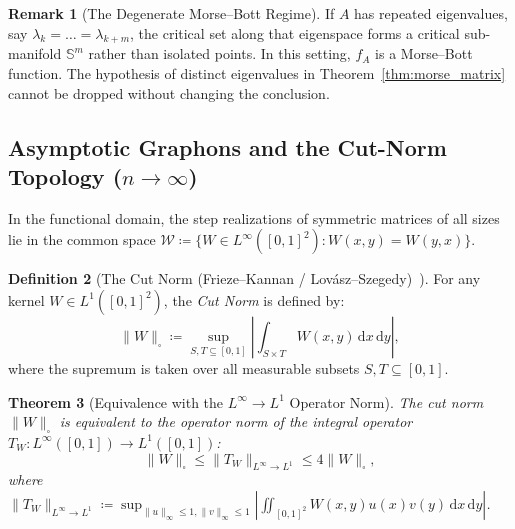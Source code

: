\documentclass[11pt,a4paper,reqno]{amsart}
\newtheorem{theorem}{Theorem}[section]
\theoremstyle{definition}
\newtheorem{definition}[theorem]{Definition}
\newtheorem{remark}[theorem]{Remark}
\numberwithin{equation}{section}
\newcommand{\Sph}{\mathbb{S}}
\newcommand{\cutnorm}[1]{\|#1\|_{\square}}
\newcommand{\dif}{\,\mathrm{d}}
\begin{document}
\begin{remark}[The Degenerate Morse--Bott Regime]
If $A$ has repeated eigenvalues, say $\lambda_k = \dots = \lambda_{k+m}$, the critical set along that eigenspace forms a critical sub-manifold $\Sph^m$ rather than isolated points. In this setting, $f_A$ is a Morse--Bott function. The hypothesis of distinct eigenvalues in Theorem~\ref{thm:morse_matrix} cannot be dropped without changing the conclusion.
\end{remark}

\subsection{Asymptotic Graphons and the Cut-Norm Topology (\texorpdfstring{$n \to \infty$}{n -> infinity})}
\label{subsec:graphon_cutnorm}

In the functional domain, the step realizations of symmetric matrices of all sizes lie in the common space $\mathcal{W} \coloneqq \{W \in L^\infty([0, 1]^2) \colon W(x, y) = W(y, x)\}$.

\begin{definition}[The Cut Norm (Frieze--Kannan / Lov\'asz--Szegedy)~\cite{frieze1999quick,lovasz2006limits,borgs2008convergent}]
For any kernel $W \in L^1([0, 1]^2)$, the \emph{Cut Norm} is defined by:
\begin{equation}
    \label{eq:cut_norm_def}
    \cutnorm{W} \coloneqq \sup_{S, T \subseteq [0, 1]} \left| \int_{S \times T} W(x, y) \dif x \dif y \right|,
\end{equation}
where the supremum is taken over all measurable subsets $S, T \subseteq [0, 1]$.
\end{definition}

\begin{theorem}[Equivalence with the $L^\infty \to L^1$ Operator Norm]
\label{thm:grothendieck_cutnorm}
The cut norm $\cutnorm{W}$ is equivalent to the operator norm of the integral operator $T_W \colon L^\infty([0,1]) \to L^1([0,1])$:
\begin{equation}
    \cutnorm{W} \le \|T_W\|_{L^\infty \to L^1} \le 4 \cutnorm{W},
\end{equation}
where $\|T_W\|_{L^\infty \to L^1} \coloneqq \sup_{\|u\|_\infty \le 1, \|v\|_\infty \le 1} \left| \iint_{[0,1]^2} W(x, y) u(x) v(y) \dif x \dif y \right|$.
\end{theorem}
\end{document}
